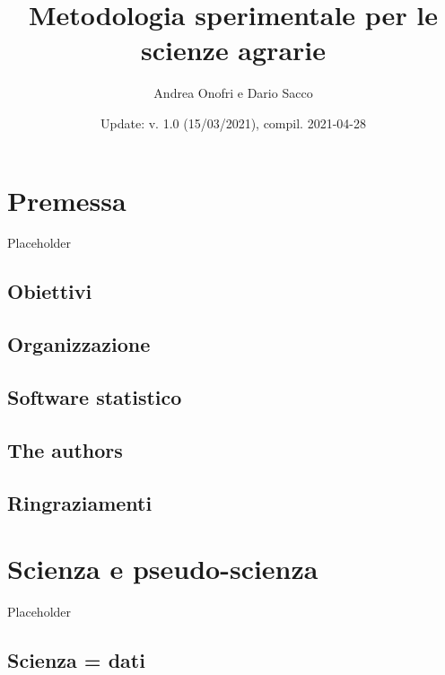 \documentclass[a4paper,12pt,oneside]{book}
\author{Andrea Onofri e Dario Sacco}
\date{Update: v. 1.0 (15/03/2021), compil. 2021-04-28}
\title{Metodologia sperimentale per le scienze agrarie}
\subtitle{}
\begin{document}
\maketitle
\tableofcontents

\hypertarget{premessa}{%
\chapter*{Premessa}\label{premessa}}

Placeholder

\hypertarget{obiettivi}{%
\section*{Obiettivi}\label{obiettivi}}

\hypertarget{organizzazione}{%
\section*{Organizzazione}\label{organizzazione}}

\hypertarget{software-statistico}{%
\section*{Software statistico}\label{software-statistico}}

\hypertarget{the-authors}{%
\section*{The authors}\label{the-authors}}

\hypertarget{ringraziamenti}{%
\section*{Ringraziamenti}\label{ringraziamenti}}

\hypertarget{scienza-e-pseudo-scienza}{%
\chapter{Scienza e pseudo-scienza}\label{scienza-e-pseudo-scienza}}

Placeholder

\hypertarget{scienza-dati}{%
\section{Scienza = dati}\label{scienza-dati}}
\end{document}
